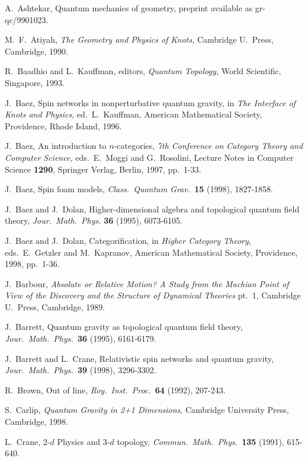 \documentclass[12pt,amsfonts]{article}
\begin{document}
\begin{thebibliography}{99}

 A.\ Ashtekar, Quantum mechanics of geometry,
preprint available as gr-qc/9901023.

 M.\ F.\ Atiyah, {\sl The Geometry and Physics of
Knots,} Cambridge U.\ Press, Cambridge, 1990.

 R.\ Baadhio and L.\ Kauffman, editors, {\sl Quantum Topology,} 
World Scientific, Singapore, 1993.  

 J.\ Baez, Spin networks in nonperturbative quantum gravity,
in {\sl The Interface of Knots and Physics}, ed.\ L.\ Kauffman, American
Mathematical Society, Providence, Rhode Island, 1996.

 J.\ Baez, An introduction to $n$-categories, {\sl  7th
Conference on Category Theory and Computer Science,} eds.\  E.\ Moggi
and G.\ Rosolini, Lecture Notes in Computer Science {\bf 1290}, Springer
Verlag, Berlin, 1997, pp.\ 1-33.

 J.\ Baez, Spin foam models, {\sl Class.\ Quantum
Grav.\ }{\bf 15} (1998), 1827-1858.

 J.\ Baez and J.\ Dolan, Higher-dimensional algebra
and topological quantum field theory, {\sl Jour.\ Math.\ Phys.} {\bf 36}
(1995), 6073-6105. 

 J.\ Baez and J.\ Dolan, Categorification, in
{\sl Higher Category Theory}, eds.\ E.\ Getzler and M.\ Kapranov, 
American Mathematical Society, Providence, 1998, pp.\ 1-36.

 J.\ Barbour, {\sl Absolute or Relative Motion?  A
Study from the Machian Point of View of the Discovery and the Structure
of Dynamical Theories} pt.\ 1, Cambridge U.\ Press, Cambridge, 1989.

 J.\ Barrett, Quantum gravity as topological quantum field
theory, {\sl Jour.\ Math.\ Phys.\ }{\bf 36} (1995), 6161-6179.

 J.\ Barrett and L.\ Crane, Relativistic spin networks
and quantum gravity, {\sl Jour.\ Math.\ Phys.\ }{\bf 39} (1998), 
3296-3302.

 R.\ Brown, Out of line, {\sl Roy.\ Inst.\ Proc.\ }{\bf 64}
(1992), 207-243.

 S.\ Carlip, {\sl Quantum Gravity in 2+1 Dimensions}, 
Cambridge University Press, Cambridge, 1998.   

 L.\ Crane, 2-$d$ Physics and 3-$d$ topology, 
{\sl Commun.\ Math.\ Phys.\ }{\bf 135} (1991), 615-640.


\end{thebibliography}
\end{document}
